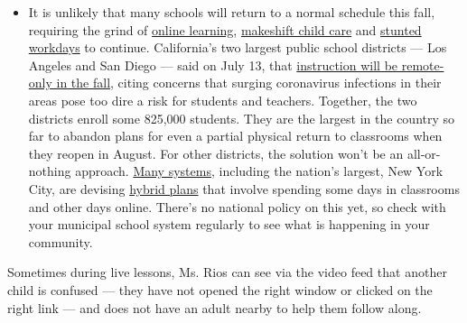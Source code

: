 \begin{itemize}
  \begin{itemize}
  \tightlist
  \item
    It is unlikely that many schools will return to a normal schedule
    this fall, requiring the grind of
    \href{https://www.nytimes.com/2020/06/05/us/coronavirus-education-lost-learning.html?action=click\&pgtype=Article\&state=default\&region=MAIN_CONTENT_3\&context=storylines_faq}{online
    learning},
    \href{https://www.nytimes.com/2020/05/29/us/coronavirus-child-care-centers.html?action=click\&pgtype=Article\&state=default\&region=MAIN_CONTENT_3\&context=storylines_faq}{makeshift
    child care} and
    \href{https://www.nytimes.com/2020/06/03/business/economy/coronavirus-working-women.html?action=click\&pgtype=Article\&state=default\&region=MAIN_CONTENT_3\&context=storylines_faq}{stunted
    workdays} to continue. California's two largest public school
    districts --- Los Angeles and San Diego --- said on July 13, that
    \href{https://www.nytimes.com/2020/07/13/us/lausd-san-diego-school-reopening.html?action=click\&pgtype=Article\&state=default\&region=MAIN_CONTENT_3\&context=storylines_faq}{instruction
    will be remote-only in the fall}, citing concerns that surging
    coronavirus infections in their areas pose too dire a risk for
    students and teachers. Together, the two districts enroll some
    825,000 students. They are the largest in the country so far to
    abandon plans for even a partial physical return to classrooms when
    they reopen in August. For other districts, the solution won't be an
    all-or-nothing approach.
    \href{https://bioethics.jhu.edu/research-and-outreach/projects/eschool-initiative/school-policy-tracker/}{Many
    systems}, including the nation's largest, New York City, are
    devising
    \href{https://www.nytimes.com/2020/06/26/us/coronavirus-schools-reopen-fall.html?action=click\&pgtype=Article\&state=default\&region=MAIN_CONTENT_3\&context=storylines_faq}{hybrid
    plans} that involve spending some days in classrooms and other days
    online. There's no national policy on this yet, so check with your
    municipal school system regularly to see what is happening in your
    community.
  \end{itemize}
\end{itemize}

Sometimes during live lessons, Ms. Rios can see via the video feed that
another child is confused --- they have not opened the right window or
clicked on the right link --- and does not have an adult nearby to help
them follow along.

